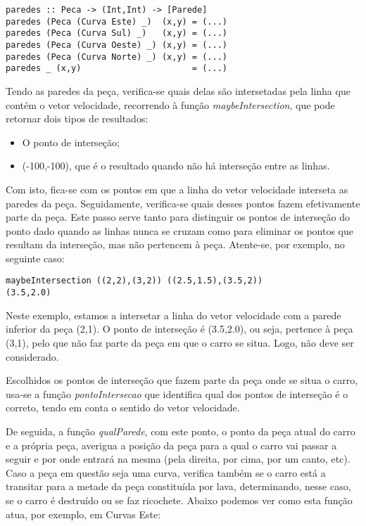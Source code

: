 \documentclass[a4paper]{report}
\begin{document}
\begin{verbatim}
paredes :: Peca -> (Int,Int) -> [Parede]    
paredes (Peca (Curva Este) _)  (x,y) = (...)
paredes (Peca (Curva Sul) _)   (x,y) = (...)
paredes (Peca (Curva Oeste) _) (x,y) = (...)
paredes (Peca (Curva Norte) _) (x,y) = (...)
paredes _ (x,y)                      = (...)
\end{verbatim}

Tendo as paredes da peça, verifica-se quais delas são intersetadas pela linha que contém o vetor velocidade, recorrendo à função \textit{maybeIntersection}, que pode retornar dois tipos de resultados:

\begin{itemize}
    \item O ponto de interseção;
    \item (-100,-100), que é o resultado quando não há interseção entre as linhas.
\end{itemize}

Com isto, fica-se com os pontos em que a linha do vetor velocidade interseta as paredes da peça. Seguidamente, verifica-se quais desses pontos fazem efetivamente parte da peça. Este passo serve tanto para distinguir os pontos de interseção do ponto dado quando as linhas nunca se cruzam como para eliminar os pontos que resultam da interseção, mas não pertencem à peça. Atente-se, por exemplo, no seguinte caso:

\begin{verbatim}
maybeIntersection ((2,2),(3,2)) ((2.5,1.5),(3.5,2))
(3.5,2.0)
\end{verbatim}

Neste exemplo, estamos a intersetar a linha do vetor velocidade com a parede inferior da peça (2,1). O ponto de interseção é (3.5,2.0), ou seja, pertence à peça (3,1), pelo que não faz parte da peça em que o carro se situa. Logo, não deve ser considerado.

Escolhidos os pontos de interseção que fazem parte da peça onde se situa o carro, usa-se a função \textit{pontoIntersecao} que identifica qual dos pontos de interseção é o correto, tendo em conta o sentido do vetor velocidade.

De seguida, a função \textit{qualParede}, com este ponto, o ponto da peça atual do carro e a própria peça, averigua a posição da peça para a qual o carro vai passar a seguir e por onde entrará na mesma (pela direita, por cima, por um canto, etc). Caso a peça em questão seja uma curva, verifica também se o carro está a transitar para a metade da peça constituída por lava, determinando, nesse caso, se o carro é destruído ou se faz ricochete.  Abaixo podemos ver como esta função atua, por exemplo, em Curvas Este:
\end{document}
